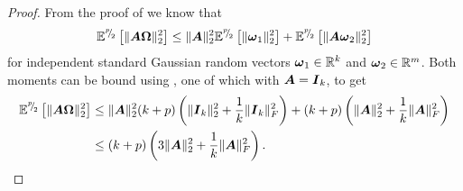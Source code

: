\documentclass[12pt]{article}
\begin{document}
\begin{proof}
    From the proof of \cite[lemma B.1]{tropp-2023-randomized-algorithms} we know that
    \begin{equation}
        \mathbb{E}^{{}^{p}{\mskip -5mu/\mskip -3mu}_{2}}\left[ \lVert \boldsymbol{A} \boldsymbol{\Omega} \rVert _2^2 \right]
        \leq \lVert \boldsymbol{A} \rVert _2^2 \mathbb{E}^{{}^{p}{\mskip -5mu/\mskip -3mu}_{2}}\left[ \lVert \boldsymbol{\omega}_1 \rVert _2^2 \right] + \mathbb{E}^{{}^{p}{\mskip -5mu/\mskip -3mu}_{2}}\left[ \lVert \boldsymbol{A} \boldsymbol{\omega}_2 \rVert _2^2 \right]
    \end{equation}
    for independent standard Gaussian random vectors $\boldsymbol{\omega}_1 \in \mathbb{R}^{k}$ and $\boldsymbol{\omega}_2 \in \mathbb{R}^{m}$. Both moments can be bound using , one of which with $\boldsymbol{A} = \boldsymbol{I}_k$, to get
    \begin{align}
        \mathbb{E}^{{}^{p}{\mskip -5mu/\mskip -3mu}_{2}}\left[ \lVert \boldsymbol{A} \boldsymbol{\Omega} \rVert _2^2 \right]
        &\leq \lVert \boldsymbol{A} \rVert _2^2 (k + p) \left( \lVert \boldsymbol{I}_k \rVert _2^2 + \frac{1}{k} \lVert \boldsymbol{I}_k \rVert _F^2 \right) + (k + p) \left( \lVert \boldsymbol{A} \rVert _2^2 + \frac{1}{k} \lVert \boldsymbol{A} \rVert _F^2 \right) \notag \\
        &\leq (k + p) \left( 3 \lVert \boldsymbol{A} \rVert _2^2 + \frac{1}{k} \lVert \boldsymbol{A} \rVert _F^2 \right).
    \end{align}


\end{proof}
\end{document}
